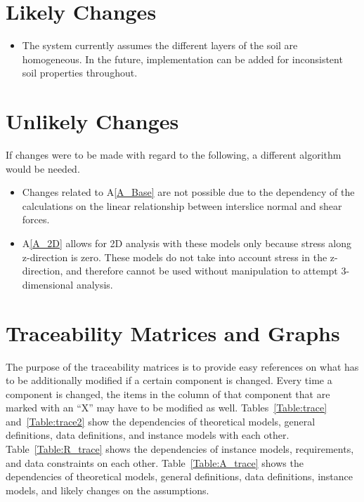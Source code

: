 \documentclass[12pt]{article}
\newcommand{\aref}[1]{A\ref{#1}}
\newcounter{lcnum} %
\newcommand{\lthelcnum}{LC\thelcnum}
\newcounter{ucnum} %
\newcommand{\ltheucnum}{UC\theucnum}
\begin{document}

\section{Likely Changes}

\noindent \begin{itemize}
\item[\refstepcounter{lcnum}\lthelcnum \label{LC_inhomogeneous}:] The system 
currently assumes the different layers of the soil are homogeneous.
 In the future, implementation can be added for inconsistent soil properties 
 throughout.
\end{itemize}

\section{Unlikely Changes}
If changes were to be made with regard to the following,
a different algorithm would be needed.

\begin{itemize}
\item[\refstepcounter{ucnum}\ltheucnum \label{UC_insf}:] Changes related to 
\aref{A_Base} are not possible due to the dependency of the calculations on the 
linear relationship between interslice normal and shear forces.
\item[\refstepcounter{ucnum}\ltheucnum \label{UC_inhomogeneous}:] \aref{A_2D} 
allows for 2D analysis with these models only because stress along z-direction 
is zero. 
These models do not take into account stress in the z-direction, and therefore 
cannot be used without manipulation to attempt 3-dimensional analysis.
\end{itemize}


\section{Traceability Matrices and Graphs}

The purpose of the traceability matrices is to provide easy references on what
has to be additionally modified if a certain component is changed.  Every time a
component is changed, the items in the column of that component that are marked
with an ``X'' may have to be modified as well.  Tables~\ref{Table:trace} 
and~\ref{Table:trace2} show the dependencies of theoretical models, general 
definitions, data definitions, and instance models with each other. 
Table~\ref{Table:R_trace} shows the dependencies of instance models, 
requirements, and data constraints on each other. Table~\ref{Table:A_trace} 
shows the dependencies of theoretical models, general definitions, data 
definitions, instance models, and likely changes on the assumptions.
\end{document}
